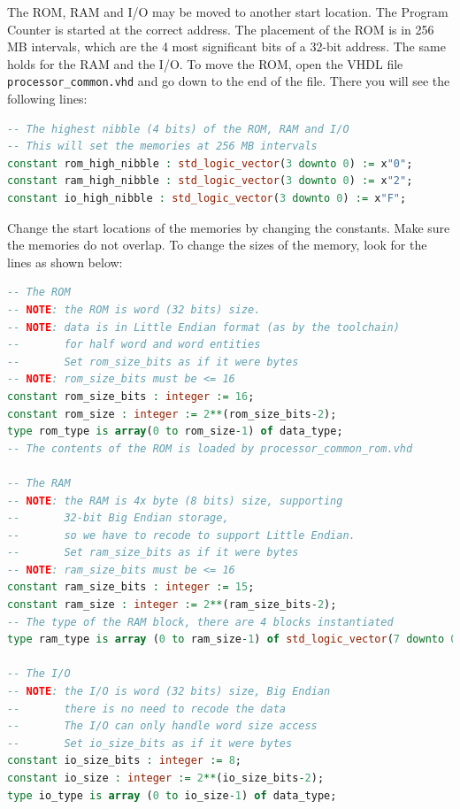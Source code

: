 \documentclass[12pt]{article}
\begin{document}
The ROM, RAM and I/O may be moved to another start location. The Program Counter is started at the correct address. The placement of the ROM is in 256 MB intervals, which are the 4 most significant bits of a 32-bit address. The same holds for the RAM and the I/O. To move the ROM, open the VHDL file \lstinline|processor_common.vhd| and go down to the end of the file. There you will see the following lines:

\begin{lstlisting}[language=VHDL]
-- The highest nibble (4 bits) of the ROM, RAM and I/O
-- This will set the memories at 256 MB intervals
constant rom_high_nibble : std_logic_vector(3 downto 0) := x"0";
constant ram_high_nibble : std_logic_vector(3 downto 0) := x"2";
constant io_high_nibble : std_logic_vector(3 downto 0) := x"F";
\end{lstlisting}

Change the start locations of the memories by changing the constants. Make sure the memories do not overlap. To change the sizes of the memory, look for the lines as shown below:

\begin{lstlisting}[language=VHDL]
-- The ROM
-- NOTE: the ROM is word (32 bits) size.
-- NOTE: data is in Little Endian format (as by the toolchain)
--       for half word and word entities
--       Set rom_size_bits as if it were bytes
-- NOTE: rom_size_bits must be <= 16
constant rom_size_bits : integer := 16;
constant rom_size : integer := 2**(rom_size_bits-2);
type rom_type is array(0 to rom_size-1) of data_type;
-- The contents of the ROM is loaded by processor_common_rom.vhd

-- The RAM
-- NOTE: the RAM is 4x byte (8 bits) size, supporting
--       32-bit Big Endian storage,
--       so we have to recode to support Little Endian.
--       Set ram_size_bits as if it were bytes
-- NOTE: ram_size_bits must be <= 16
constant ram_size_bits : integer := 15;
constant ram_size : integer := 2**(ram_size_bits-2);
-- The type of the RAM block, there are 4 blocks instantiated
type ram_type is array (0 to ram_size-1) of std_logic_vector(7 downto 0);
                    
-- The I/O
-- NOTE: the I/O is word (32 bits) size, Big Endian
--       there is no need to recode the data
--       The I/O can only handle word size access
--       Set io_size_bits as if it were bytes
constant io_size_bits : integer := 8;
constant io_size : integer := 2**(io_size_bits-2);
type io_type is array (0 to io_size-1) of data_type;
\end{lstlisting}
\end{document}
